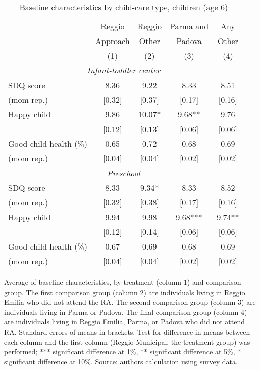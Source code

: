 \begin{table}[H]
\caption{Baseline characteristics by child-care type, children (age 6)}
\label{tab:child_OUTCOME}
\centering
\begin{adjustbox}{width=0.65\textwidth,center=\textwidth}
\small
\begin{tabular}{l cccc}
\hline \hline 
 & Reggio & Reggio & Parma and & Any \\
 & Approach & Other & Padova & Other \\
 &   (1)    &  (2)  & (3)    &  (4) \\
%
\hline 
\multicolumn{5}{c}{\textit{Infant-toddler center}} \\
\hline 
%
SDQ score & 8.36 & 9.22 & 8.33 & 8.51 \\
(mom rep.)  & [0.32] & [0.37] & [0.17] & [0.16] \\
Happy child & 9.86 & 10.07* & 9.68** & 9.76 \\
 & [0.12] & [0.13] & [0.06] & [0.06] \\
Good child health (\%) & 0.65 & 0.72 & 0.68 & 0.69 \\
(mom rep.)  & [0.04] & [0.04] & [0.02] & [0.02] \\
%
\hline 
\multicolumn{5}{c}{\textit{Preschool}} \\
\hline 
%
SDQ score & 8.33 & 9.34* & 8.33 & 8.52 \\
(mom rep.)  & [0.32] & [0.38] & [0.17] & [0.16] \\
Happy child & 9.94 & 9.98 & 9.68*** & 9.74** \\
 & [0.12] & [0.14] & [0.06] & [0.06] \\
Good child health (\%) & 0.67 & 0.69 & 0.68 & 0.69 \\
(mom rep.)  & [0.04] & [0.04] & [0.02] & [0.02] \\
\hline
\end{tabular}
\end{adjustbox}
 \vspace{1ex}

 \raggedright{
 \tiny{Average of baseline characteristics, by treatment (column 1) and comparison group.
 The first comparison group (column 2) are individuals living in Reggio Emilia who did not attend the RA. The second comparison group (column 3) are individuals living in Parma or Padova. The final comparison group (column 4) are individuals living in Reggio Emilia, Parma, or Padova who did not attend RA.
 Standard errors of means in brackets. Test for difference in means between each column and the first column (Reggio Municipal, the treatment group) was performed; *** significant difference at 1\%, ** significant difference at 5\%, * significant difference at 10\%. Source: authors calculation using survey data.}
 }
\end{table}
